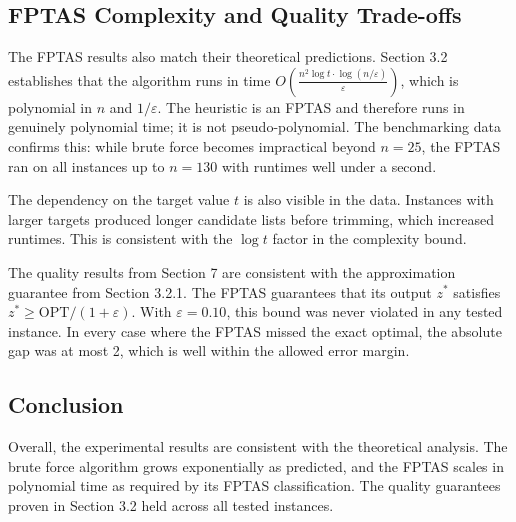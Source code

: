 \documentclass[12pt,a4paper]{article}
\theoremstyle{definition}
\begin{document}
\subsection{FPTAS Complexity and Quality Trade-offs}

The FPTAS results also match their theoretical predictions. Section 3.2 establishes that the algorithm runs in time $O\left(\frac{n^2 \log t \cdot \log(n/\varepsilon)}{\varepsilon}\right)$, which is polynomial in $n$ and $1/\varepsilon$. The heuristic is an FPTAS and therefore runs in genuinely polynomial time; it is not pseudo-polynomial. The benchmarking data confirms this: while brute force becomes impractical beyond $n = 25$, the FPTAS ran on all instances up to $n = 130$ with runtimes well under a second.

The dependency on the target value $t$ is also visible in the data. Instances with larger targets produced longer candidate lists before trimming, which increased runtimes. This is consistent with the $\log t$ factor in the complexity bound.

The quality results from Section 7 are consistent with the approximation guarantee from Section 3.2.1. The FPTAS guarantees that its output $z^*$ satisfies $z^* \ge \mathrm{OPT}/(1+\varepsilon)$. With $\varepsilon = 0.10$, this bound was never violated in any tested instance. In every case where the FPTAS missed the exact optimal, the absolute gap was at most 2, which is well within the allowed error margin.

\subsection{Conclusion}

Overall, the experimental results are consistent with the theoretical analysis. The brute force algorithm grows exponentially as predicted, and the FPTAS scales in polynomial time as required by its FPTAS classification. The quality guarantees proven in Section 3.2 held across all tested instances.
\end{document}
